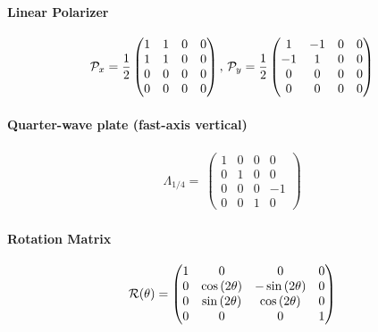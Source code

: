 \paragraph{Linear Polarizer}
\begin{align}
\mathcal{P}_x=\frac{1}{2}
\begin{pmatrix}
    1 & 1 & 0 & 0 \\
    1 & 1 & 0 & 0 \\
    0 & 0 & 0 & 0 \\
    0 & 0 & 0 & 0
  \end{pmatrix}
, \,
\mathcal{P}_y=\frac{1}{2}
\begin{pmatrix}
     1 & -1 & 0 & 0 \\
    -1 &  1 & 0 & 0 \\
     0 &  0 & 0 & 0 \\
     0 &  0 & 0 & 0
\end{pmatrix}
\end{align}
% 
% 
\paragraph{Quarter-wave plate (fast-axis vertical)}
\begin{align}
\Lambda_{1/4}=\
\begin{pmatrix}
    1 & 0 & 0 &  0 \\
    0 & 1 & 0 &  0 \\
    0 & 0 & 0 & -1 \\
    0 & 0 & 1 &  0
\end{pmatrix}
\end{align}
% 
\paragraph{Rotation Matrix}
\begin{align}
\mathcal{R}(\theta)=
\begin{split}
\begin{pmatrix}
    1 &                0 &               0 & 0 \\
    0 & \cos{(2\theta)} & -\sin{(2\theta)} & 0 \\
    0 & \sin{(2\theta)} & \cos{(2\theta)} & 0 \\
    0 &                0 &               0 & 1
  \end{pmatrix}
\end{split}
\end{align}
% 
% 
